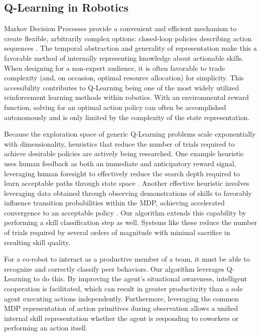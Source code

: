 \documentclass[letterpaper]{article}
\begin{document}
\subsection{Q-Learning in Robotics}
  Markov Decision Processes provide a convenient and efficient mechanism to create flexible, arbitrarily complex options: closed-loop policies describing action sequences \cite{SuttonMDP}. The temporal abstraction and generality of representation make this a favorable method of internally representing knowledge about actionable skills. When designing for a non-expert audience, it is often favorable to trade complexity (and, on occasion, optimal resource allocation) for simplicity. This accessibility contributes to Q-Learning \cite{QLearningWatkins} being one of the most widely utilized reinforcement learning methods within robotics. With an environmental reward function, solving for an optimal action policy can often be accomplished autonomously and is only limited by the complexity of the state representation.

  Because the exploration space of generic Q-Learning problems scale exponentially with dimensionality, heuristics that reduce the number of trials required to achieve desirable policies are actively being researched. One example heuristic uses human feedback as both an immediate and anticipatory reward signal, leveraging human foresight to effectively reduce the search depth required to learn acceptable paths through state space \cite{TAMER}. Another effective heuristic involves leveraging data obtained through observing demonstrations of skills to favorably influence transition probabilities within the MDP, achieving accelerated convergence to an acceptable policy \cite{LFDSurvey}. Our algorithm extends this capability by performing a skill classification step as well. Systems like these reduce the number of trials required by several orders of magnitude with minimal sacrifice in resulting skill quality.

  For a co-robot to interact as a productive member of a team, it must be able to recognize and correctly classify peer behaviors. Our algorithm leverages Q-Learning to do this.  By improving the agent's situational awareness, intelligent cooperation is facilitated, which can result in greater productivity than a sole agent executing actions independently.  Furthermore, leveraging the common MDP representation of action primitives during observation allows a unified internal skill representation whether the agent is responding to coworkers or performing an action itself.
\end{document}
